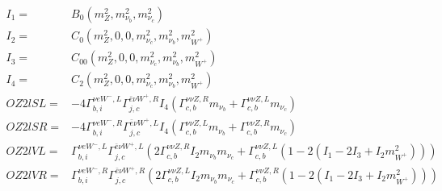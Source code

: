 \documentclass[A4,landscape]{article}
\begin{document}
\begin{align} 
I_1= & B_0(m^2_{Z}, m^2_{\nu_{{b}}}, m^2_{\nu_{{c}}}) \\ 
I_2= & C_0(m^2_{Z}, 0, 0, m^2_{\nu_{{c}}}, m^2_{\nu_{{b}}}, m^2_{W^+}) \\ 
I_3= & C_{00}(m^2_{Z}, 0, 0, m^2_{\nu_{{c}}}, m^2_{\nu_{{b}}}, m^2_{W^+}) \\ 
I_4= & C_2(m^2_{Z}, 0, 0, m^2_{\nu_{{c}}}, m^2_{\nu_{{b}}}, m^2_{W^+}) \\ 
  OZ2lSL= & -4  \Gamma^{\nu e W^-,L}_{b, i} \Gamma^{\bar{e}\nu W^+ ,R}_{j, c} I_4 (\Gamma^{\nu \nu Z ,R}_{c, b} m_{\nu_{{b}}} + \Gamma^{\nu \nu Z ,L}_{c, b} m_{\nu_{{c}}}) \\ 
  OZ2lSR= & -4  \Gamma^{\nu e W^-,R}_{b, i} \Gamma^{\bar{e}\nu W^+ ,L}_{j, c} I_4 (\Gamma^{\nu \nu Z ,L}_{c, b} m_{\nu_{{b}}} + \Gamma^{\nu \nu Z ,R}_{c, b} m_{\nu_{{c}}}) \\ 
  OZ2lVL= &  \Gamma^{\nu e W^-,L}_{b, i} \Gamma^{\bar{e}\nu W^+ ,L}_{j, c} (2 \Gamma^{\nu \nu Z ,R}_{c, b} I_2 m_{\nu_{{b}}} m_{\nu_{{c}}} + \Gamma^{\nu \nu Z ,L}_{c, b} (1 - 2 (I_1 - 2 I_3 + I_2 m^2_{W^+}))) \\ 
  OZ2lVR= &  \Gamma^{\nu e W^-,R}_{b, i} \Gamma^{\bar{e}\nu W^+ ,R}_{j, c} (2 \Gamma^{\nu \nu Z ,L}_{c, b} I_2 m_{\nu_{{b}}} m_{\nu_{{c}}} + \Gamma^{\nu \nu Z ,R}_{c, b} (1 - 2 (I_1 - 2 I_3 + I_2 m^2_{W^+}))) \\ 
\end{align} 
\end{document}
